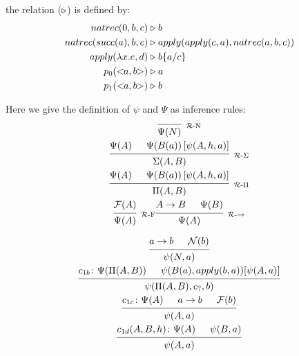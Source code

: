 \documentclass[12pt,draft,oneside]{amsbook}
\begin{document}
	\begin{dede}
		the  relation ($\mathrel{\triangleright}$)
		is defined by:
		\begin{equation}
		\begin{split}
		natrec(0, b, c) & \ctr  b \\
		natrec(succ(a), b, c) & \ctr  apply(apply(c,  a), natrec(a, b, c)) \\
		apply(\lambda x.e, d) & \ctr  \sbs{b}{a}{c}\\
		p_0(\cp[a,b]) & \ctr a\\
		p_1(\cp[a,b]) & \ctr b		
		\end{split}
		\end{equation}	
	\end{dede}
	
	\begin{dede}
	Here we give the definition of $\psi$ and $\Psi$ as inference rules:
	\begin{gather*}
	\begin{prooftree}
	\Infer{0}[${}_\RN$]{\Psi(N)}
	\end{prooftree}	\label{def:RN}\\
	\begin{prooftree}
	\Hypo{\Psi(A)}
	\Hypo{\Psi(B(a)) \left[\psi(A,h,a)\right]}
	\Infer2[${}_\RS$]{\Sigma(A,B)}		
	\end{prooftree}\\
	\begin{prooftree}
	\Hypo{\Psi(A)}
	\Hypo{\Psi(B(a)) \left[\psi(A,h,a)\right]}
	\Infer2[${}_\RP$]{\Pi(A,B)}		
	\end{prooftree}\\
	\begin{prooftree}
	\Hypo{\mathcal{F}(A)}
	\Infer1[${}_\RF$]{\Psi(A)}
	\end{prooftree}
	\begin{prooftree}
	\Hypo{A\rightarrow B}
	\Hypo{\Psi(B)}
	\Infer2[${}_\RAr$]{\Psi(A)}
	\end{prooftree}
	\end{gather*}
	
	
	\begin{gather}
	\begin{prooftree}
	\Hypo{a \rightarrow b}
	\Hypo{\mathcal{N}(b) }
	\Infer2{\psi(N,a)}
	\end{prooftree}	
	\\
	\begin{prooftree}
		\Hypo{c_{1b} \colon \Psi(\Pi(A,B))}
		\Hypo{\psi(B(a), apply(b, a))[\psi(A,a)]}
		\Infer{2}{\psi(\Pi(A,B),c_?,b)}
	\end{prooftree}\\		
	\begin{prooftree}
	\Hypo{c_{1c} \colon \Psi(A)}
	\Hypo{a \rightarrow b}
	\Hypo{\mathcal{F}(b)}
	\Infer3{\psi(A,a)}
	\end{prooftree}	\\		
	\begin{prooftree}
	\Hypo{c_{1d}(A,B,h) \colon \Psi(A)}
	\Hypo{\psi(B,a)}
	\Infer2{\psi(A,a)}
	\end{prooftree}	
	\end{gather}
	

\end{dede}
\end{document}
